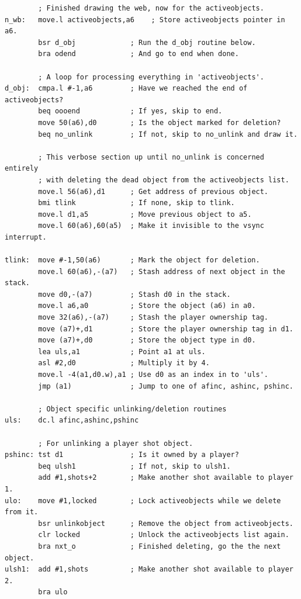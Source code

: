 \begin{lstlisting}
        ; Finished drawing the web, now for the activeobjects.
n_wb:   move.l activeobjects,a6    ; Store activeobjects pointer in a6.
        bsr d_obj             ; Run the d_obj routine below.
        bra odend             ; And go to end when done.
    
        ; A loop for processing everything in 'activeobjects'.
d_obj:  cmpa.l #-1,a6         ; Have we reached the end of activeobjects?
        beq oooend            ; If yes, skip to end.
        move 50(a6),d0        ; Is the object marked for deletion?
        beq no_unlink         ; If not, skip to no_unlink and draw it.
    
        ; This verbose section up until no_unlink is concerned entirely
        ; with deleting the dead object from the activeobjects list.
        move.l 56(a6),d1      ; Get address of previous object.
        bmi tlink             ; If none, skip to tlink.
        move.l d1,a5          ; Move previous object to a5.
        move.l 60(a6),60(a5)  ; Make it invisible to the vsync interrupt.
    
tlink:  move #-1,50(a6)       ; Mark the object for deletion.
        move.l 60(a6),-(a7)   ; Stash address of next object in the stack.
        move d0,-(a7)         ; Stash d0 in the stack.
        move.l a6,a0          ; Store the object (a6) in a0.
        move 32(a6),-(a7)     ; Stash the player ownership tag.
        move (a7)+,d1         ; Store the player ownership tag in d1.
        move (a7)+,d0         ; Store the object type in d0.
        lea uls,a1            ; Point a1 at uls.
        asl #2,d0             ; Multiply it by 4.
        move.l -4(a1,d0.w),a1 ; Use d0 as an index in to 'uls'.
        jmp (a1)              ; Jump to one of afinc, ashinc, pshinc.
    
        ; Object specific unlinking/deletion routines
uls:    dc.l afinc,ashinc,pshinc
    
        ; For unlinking a player shot object.
pshinc: tst d1                ; Is it owned by a player?
        beq ulsh1             ; If not, skip to ulsh1.
        add #1,shots+2        ; Make another shot available to player 1.
ulo:    move #1,locked        ; Lock activeobjects while we delete from it.
        bsr unlinkobject      ; Remove the object from activeobjects.
        clr locked            ; Unlock the activeobjects list again.
        bra nxt_o             ; Finished deleting, go the the next object.
ulsh1:  add #1,shots          ; Make another shot available to player 2.
        bra ulo
\end{lstlisting}
